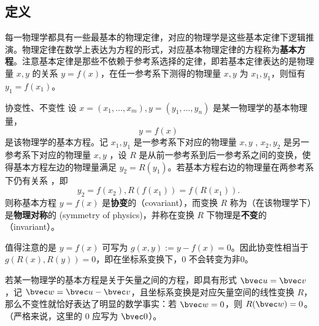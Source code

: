 \subsection{定义}
每一物理学都具有一些最基本的物理定律，对应的物理学是这些基本定律下逻辑推演。物理定律在数学上表达为方程的形式，对应基本物理定律的方程称为\textbf{基本方程}。注意基本定律是那些不依赖于参考系选择的定律，即若基本定律表达的是物理量 $x,y$ 的关系 $y=f(x)$，在任一参考系下测得的物理量 $x,y$ 为 $x_1,y_1$，则恒有 $y_1=f(x_1)$。
\begin{definition}{协变性、不变性}\label{def_CoIn_1}
设 $x=(x_1,\ldots,x_m),y=(y_1,\ldots,y_n)$ 是某一物理学的基本物理量，
\begin{equation}
y=f(x)~
\end{equation}
是该物理学的基本方程。记 $x_1,y_1$ 是一参考系下对应的物理量 $x,y$ , $x_2,y_2$ 是另一参考系下对应的物理量 $x,y$ ，设 $R$ 是从前一参考系到后一参考系之间的变换，使得基本方程左边的物理量满足 $y_2=R(y_1)$。若基本方程右边的物理量在两参考系下仍有关系 ，即
\begin{equation}
y_2=f(x_2),R(f(x_1))=f(R(x_1)).~
\end{equation}
则称基本方程 $y=f(x)$ 是\textbf{协变}的（covariant），而变换 $R$ 称为（在该物理学下）是\textbf{物理对称}的 (symmetry of physics)，并称在变换 $R$ 下物理是\textbf{不变}的（invariant）。
\end{definition}

值得注意的是 $y=f(x)$ 可写为 $g(x,y):=y-f(x)=0$。因此协变性相当于 $g(R(x),R(y))=0$，即在坐标系变换下，$0$ 不会转变为非0。
\begin{example}{}
若某一物理学的基本方程是关于矢量之间的方程，即具有形式 $\bvec u=\bvec v$，记 $\bvec w=\bvec u-\bvec v$，且坐标系变换是对应矢量空间的线性变换 $R$，那么不变性就恰好表达了明显的数学事实：若 $\bvec w=0$，则 $R(\bvec w)=0$。（严格来说，这里的 0 应写为 $\bvec 0$）。
\end{example}














